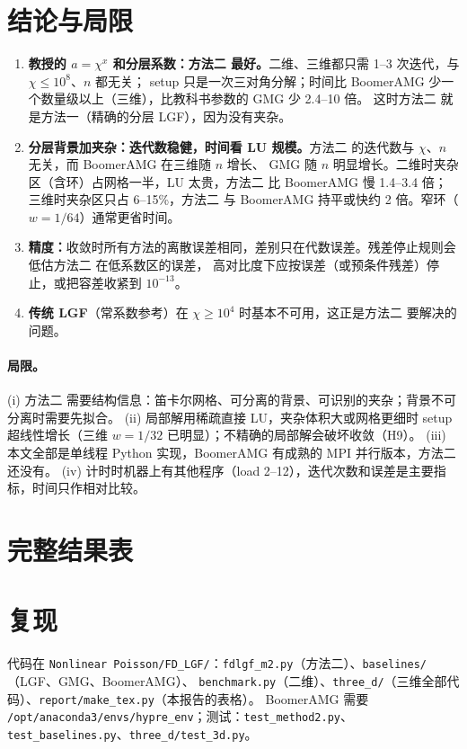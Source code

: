 \documentclass[11pt,a4paper]{ctexart}
\newcommand{\Mtwo}{方法二}
\begin{document}
\section{结论与局限}
\begin{enumerate}
\item \textbf{教授的 $a=\chi^x$ 和分层系数：\Mtwo{} 最好。}二维、三维都只需 1--3 次迭代，与 $\chi\le10^8$、$n$ 都无关；
  setup 只是一次三对角分解；时间比 BoomerAMG 少一个数量级以上（三维），比教科书参数的 GMG 少 2.4--10 倍。
  这时\Mtwo{} 就是方法一（精确的分层 LGF），因为没有夹杂。
\item \textbf{分层背景加夹杂：迭代数稳健，时间看 LU 规模。}\Mtwo{} 的迭代数与 $\chi$、$n$ 无关，而 BoomerAMG 在三维随 $n$ 增长、
  GMG 随 $n$ 明显增长。二维时夹杂区（含环）占网格一半，LU 太贵，\Mtwo{} 比 BoomerAMG 慢 1.4--3.4 倍；
  三维时夹杂区只占 6--15\%，\Mtwo{} 与 BoomerAMG 持平或快约 2 倍。窄环（$w=1/64$）通常更省时间。
\item \textbf{精度：}收敛时所有方法的离散误差相同，差别只在代数误差。残差停止规则会低估\Mtwo{} 在低系数区的误差，
  高对比度下应按误差（或预条件残差）停止，或把容差收紧到 $10^{-13}$。
\item \textbf{传统 LGF}（常系数参考）在 $\chi\ge10^4$ 时基本不可用，这正是\Mtwo{} 要解决的问题。
\end{enumerate}
\paragraph{局限。}(i) \Mtwo{} 需要结构信息：笛卡尔网格、可分离的背景、可识别的夹杂；背景不可分离时需要先拟合。
(ii) 局部解用稀疏直接 LU，夹杂体积大或网格更细时 setup 超线性增长（三维 $w=1/32$ 已明显）；不精确的局部解会破坏收敛（H9）。
(iii) 本文全部是单线程 Python 实现，BoomerAMG 有成熟的 MPI 并行版本，\Mtwo{} 还没有。
(iv) 计时时机器上有其他程序（load 2--12），迭代次数和误差是主要指标，时间只作相对比较。

\appendix
\section{完整结果表}


\section{复现}
代码在 \texttt{Nonlinear Poisson/FD\_LGF/}：\texttt{fdlgf\_m2.py}（\Mtwo{}）、\texttt{baselines/}（LGF、GMG、BoomerAMG）、
\texttt{benchmark.py}（二维）、\texttt{three\_d/}（三维全部代码）、\texttt{report/make\_tex.py}（本报告的表格）。
BoomerAMG 需要 \texttt{/opt/anaconda3/envs/hypre\_env}；测试：\texttt{test\_method2.py}、\texttt{test\_baselines.py}、\texttt{three\_d/test\_3d.py}。
\end{document}
